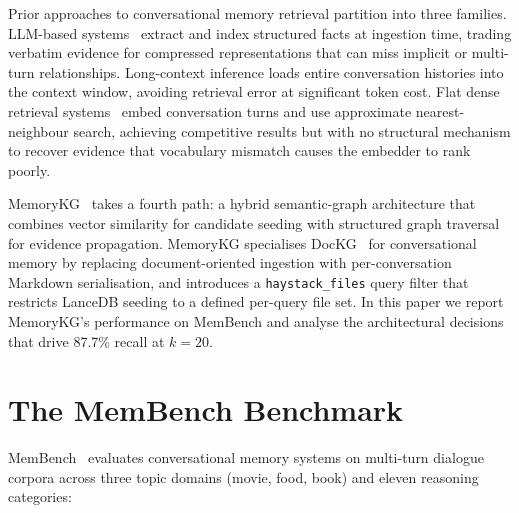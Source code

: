\documentclass[11pt,a4paper]{article}
\begin{document}
Prior approaches to conversational memory retrieval partition into three
families.
LLM-based systems~\citep{mem0} extract and index structured facts at
ingestion time, trading verbatim evidence for compressed representations
that can miss implicit or multi-turn relationships.
Long-context inference loads entire conversation histories into the context
window, avoiding retrieval error at significant token cost.
Flat dense retrieval systems~\citep{mempal2026} embed conversation turns and
use approximate nearest-neighbour search, achieving competitive results but
with no structural mechanism to recover evidence that vocabulary mismatch
causes the embedder to rank poorly.

MemoryKG~\citep{memorykg2026} takes a fourth path: a hybrid semantic-graph
architecture that combines vector similarity for candidate seeding with
structured graph traversal for evidence propagation.
MemoryKG specialises DocKG~\citep{dockg2026} for conversational memory by
replacing document-oriented ingestion with per-conversation Markdown
serialisation, and introduces a \texttt{haystack\_files} query filter that
restricts LanceDB seeding to a defined per-query file set.
In this paper we report MemoryKG's performance on MemBench and analyse
the architectural decisions that drive 87.7\% recall at $k{=}20$.

\section{The MemBench Benchmark}
\label{sec:benchmark}

MemBench~\citep{membench2025} evaluates conversational memory systems on
multi-turn dialogue corpora across three topic domains (movie, food, book)
and eleven reasoning categories:
\end{document}
